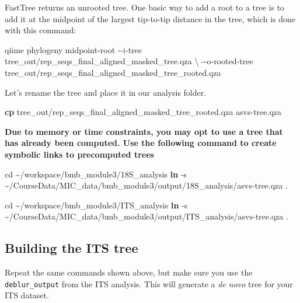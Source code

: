 \documentclass[
]{book}
\newenvironment{Shaded}{\begin{snugshade}}{\end{snugshade}}
\newcommand{\AttributeTok}[1]{\textcolor[rgb]{0.13,0.29,0.53}{#1}}
\newcommand{\BuiltInTok}[1]{#1}
\newcommand{\DataTypeTok}[1]{\textcolor[rgb]{0.13,0.29,0.53}{#1}}
\newcommand{\ExtensionTok}[1]{#1}
\newcommand{\FunctionTok}[1]{\textcolor[rgb]{0.13,0.29,0.53}{\textbf{#1}}}
\newcommand{\NormalTok}[1]{#1}
\begin{document}
FastTree returns an unrooted tree. One basic way to add a root to a tree is to add it at the midpoint of the largest tip-to-tip distance in the tree, which is done with this command:

\begin{Shaded}
\begin{Highlighting}[]
\ExtensionTok{qiime}\NormalTok{ phylogeny midpoint{-}root }\AttributeTok{{-}{-}i{-}tree}\NormalTok{ tree\_out/rep\_seqs\_final\_aligned\_masked\_tree.qza }\DataTypeTok{\textbackslash{}}
                              \AttributeTok{{-}{-}o{-}rooted{-}tree}\NormalTok{ tree\_out/rep\_seqs\_final\_aligned\_masked\_tree\_rooted.qza}
\end{Highlighting}
\end{Shaded}

Let's rename the tree and place it in our analysis folder.

\begin{Shaded}
\begin{Highlighting}[]
\FunctionTok{cp}\NormalTok{ tree\_out/rep\_seqs\_final\_aligned\_masked\_tree\_rooted.qza asvs{-}tree.qza}
\end{Highlighting}
\end{Shaded}

\textbf{Due to memory or time constraints, you may opt to use a tree that has already been computed. Use the following command to create symbolic links to precomputed trees}

\begin{Shaded}
\begin{Highlighting}[]
\BuiltInTok{cd}\NormalTok{ \textasciitilde{}/workspace/bmb\_module3/18S\_analysis}
\FunctionTok{ln} \AttributeTok{{-}s}\NormalTok{ \textasciitilde{}/CourseData/MIC\_data/bmb\_module3/output/18S\_analysis/asvs{-}tree.qza .}

\BuiltInTok{cd}\NormalTok{ \textasciitilde{}/workspace/bmb\_module3/ITS\_analysis}
\FunctionTok{ln} \AttributeTok{{-}s}\NormalTok{ \textasciitilde{}/CourseData/MIC\_data/bmb\_module3/output/ITS\_analysis/asvs{-}tree.qza .}
\end{Highlighting}
\end{Shaded}

\subsection{Building the ITS tree}\label{building-the-its-tree}

Repeat the same commands shown above, but make sure you use the \texttt{deblur\_output} from the ITS analysis. This will generate a \emph{de novo} tree for your ITS dataset.
\end{document}
